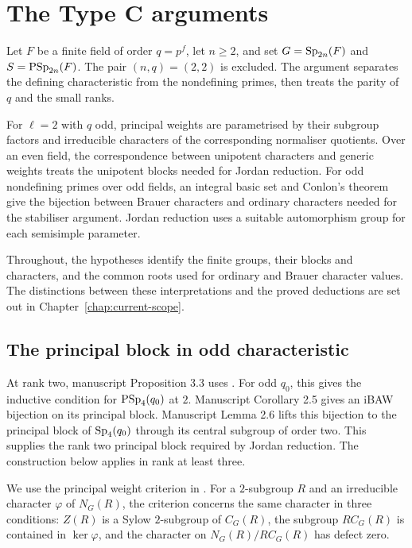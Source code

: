 \chapter{The Type C arguments}
\label{chap:current-type-c}

Let $F$ be a finite field of order $q=p^f$, let $n\geq2$, and set
$G=\operatorname{Sp}_{2n}(F)$ and $S=\operatorname{PSp}_{2n}(F)$. The pair $(n,q)=(2,2)$ is excluded.
The argument separates the defining characteristic from the nondefining
primes, then treats the parity of $q$ and the small ranks.

For $\ell=2$ with $q$ odd, principal weights are parametrised by their subgroup
factors and irreducible characters of the corresponding normaliser quotients.
Over an even field, the correspondence between
unipotent characters and generic weights treats the unipotent blocks needed for Jordan reduction. For odd nondefining primes over odd fields, an integral basic set
and Conlon's theorem give the bijection between Brauer characters and ordinary characters needed for the stabiliser argument. Jordan reduction uses a suitable automorphism group for
each semisimple parameter.

Throughout, the hypotheses identify the finite groups, their blocks and
characters, and the common roots used for ordinary and Brauer character
values. The distinctions between these interpretations and the proved
deductions are set out in Chapter~\ref{chap:current-scope}.

\section{The principal block in odd characteristic}

At rank two, manuscript Proposition 3.3 uses
\cite[Theorem~1.1]{LiLi2019}. For odd $q_0$, this gives the inductive
condition for $\operatorname{PSp}_4(q_0)$ at $2$. Manuscript Corollary 2.5 gives an
iBAW bijection on its principal block. Manuscript Lemma 2.6 lifts this
bijection to the principal block of $\operatorname{Sp}_4(q_0)$ through its central
subgroup of order two.
This supplies the rank two principal block required by Jordan reduction.
The construction below applies in rank at least three.

We use the principal weight criterion in \cite[Lemma~2.3]{FengYuZhang2024}. For
a $2$-subgroup $R$ and an irreducible character $\varphi$ of $N_G(R)$, the
criterion concerns the same character in three conditions: $Z(R)$ is a Sylow
$2$-subgroup of $C_G(R)$, the subgroup $RC_G(R)$ is contained in
$\ker\varphi$, and the character on $N_G(R)/RC_G(R)$ has defect zero.

